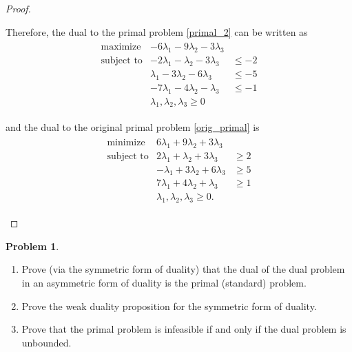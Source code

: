 \documentclass[12pt]{article}
\theoremstyle{definition}
\newtheorem{problem}{Problem}
\begin{document}
\begin{proof}
\begin{enumerate}
      Therefore, the dual to the primal problem \eqref{primal_2} can be written as
      \begin{align*}
        \begin{array}{rrl}
          \text{maximize} & -6\lambda_1 - 9\lambda_2 - 3\lambda_3 &\\
              \text{subject to} & -2\lambda_1 - \lambda_2 - 3\lambda_3 &\leq -2 \\
              & \lambda_1 - 3 \lambda_2 -  6\lambda_3 &\leq -5 \\
              & -7\lambda_1 -4 \lambda_2 - \lambda_3 &\leq -1 \\
              & \lambda_1, \lambda_2, \lambda_3 \geq 0 &
        \end{array}
      \end{align*}

      and the dual to the original primal problem \eqref{orig_primal} is
      \begin{align*}
        \begin{array}{rrl}
          \text{minimize} & 6\lambda_1 + 9\lambda_2 + 3\lambda_3 &\\
              \text{subject to} & 2\lambda_1 + \lambda_2 + 3\lambda_3 &\geq 2 \\
              & - \lambda_1 + 3 \lambda_2 +  6\lambda_3 &\geq 5 \\
              & 7\lambda_1 +4 \lambda_2 + \lambda_3 &\geq 1 \\
              & \lambda_1, \lambda_2, \lambda_3 \geq 0. &
        \end{array}
      \end{align*}
  \end{enumerate}
\end{proof}
\newpage


\begin{problem}
  \begin{enumerate}
    \item Prove (via the symmetric form of duality) that the dual of the dual problem in an asymmetric
      form of duality is the primal (standard) problem.
    \item Prove the weak duality proposition for the symmetric form of duality.
    \item Prove that the primal problem is infeasible if and only if the dual problem is unbounded.
  \end{enumerate}
\end{problem}
\end{document}
